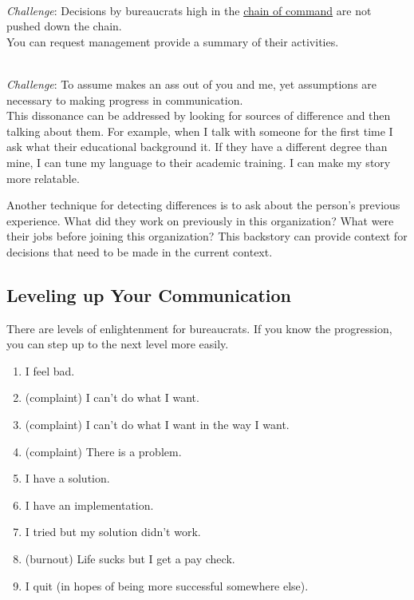 \ \\
\textit{Challenge}: Decisions by bureaucrats high in the \href{https://en.wikipedia.org/wiki/Command_hierarchy}{chain of command} are not pushed down the chain. \\
You can request management provide a summary of their activities.

\ \\
\textit{Challenge}: To assume makes an ass out of you and me, 
yet assumptions are necessary to making progress in communication.\\ 
This dissonance can be addressed by looking for sources of difference and then talking about them. For example, when I talk with someone for the first time I ask what their educational background it. If they have a different degree than mine, I can tune my language to their academic training. I can make my story more relatable. 

Another technique for detecting differences is to ask about the person's previous experience. What did they work on previously in this organization? What were their jobs before joining this organization? This backstory can provide context for decisions that need to be made in the current context. 

\subsection*{Leveling up Your Communication}

There are levels of enlightenment for bureaucrats. If you know the progression, you can step up to the next level more easily.
\begin{enumerate}
    \item I feel bad.
    \item (complaint) I can't do what I want.
    \item (complaint) I can't do what I want in the way I want.
    \item (complaint) There is a problem.
    \item I have a solution.
    \item I have an implementation.
    \item I tried but my solution didn't work.
    \item (burnout) Life sucks but I get a pay check.
    \item I quit (in hopes of being more successful somewhere else).
\end{enumerate}


